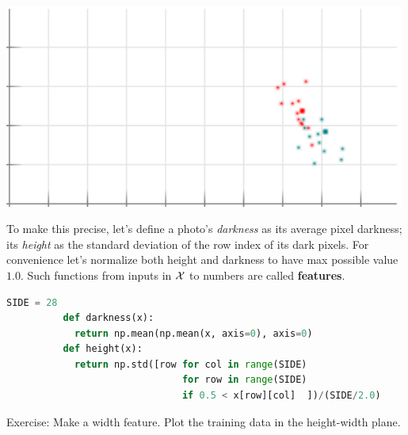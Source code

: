 \documentclass[11pt, justified]{tufte-book}
\newcommand{\attn}[1]{{\bro \textsf{#1}}}
\newcommand{\plainfootprint}{}
\newcommand{\footprint}{\marginnote{\plainfootprint} }
\theoremstyle{definition}
\begin{document}
        \begin{marginfigure}
          \centering
          \includegraphics[width=0.99\textwidth]{example-mnist/train-plain}
            \vspace{-0.25cm}
          \caption{
            Our size-$N=25$ set of training examples, viewed in the
            darkness-height plane.  The vertical \emph{darkness} axis ranges
            $[0.0,0.25]$; the horizontal \emph{height} axis ranges $[0.0,0.5]$.
            The origin is at the lower left.  Each {} dot represents a
            $y={\cya{1}}$ example; each {} dot, a $y={\red{9}}$ one.
            The big ${\red{9}}$ above has darkness and height $(0.118, 0.375)$;\
            the big ${\cya{1}}$, $(0.092, 0.404)$.  See where they are in this
            plot?
          }
        \end{marginfigure}

        To make this precise, let's define a photo's \emph{darkness} as its
        average pixel darkness; its \emph{height} as the standard deviation of
        the row index of its dark pixels.  For convenience let's normalize
        both height and darkness to have max possible value $1.0$.  Such
        functions from inputs in $\mathcal{X}$ to numbers are called
        \textbf{features}.\footprint

        \begin{lstlisting}[language=Python, basicstyle=\footnotesize\ttfamily]
          SIDE = 28
          def darkness(x):
            return np.mean(np.mean(x, axis=0), axis=0)
          def height(x):
            return np.std([row for col in range(SIDE)
                               for row in range(SIDE)
                               if 0.5 < x[row][col]  ])/(SIDE/2.0) 
        \end{lstlisting}
        \par\noindent
        \attn{Exercise:} {Make a width feature.  Plot the training data
        in the height-width plane.}
\end{document}
